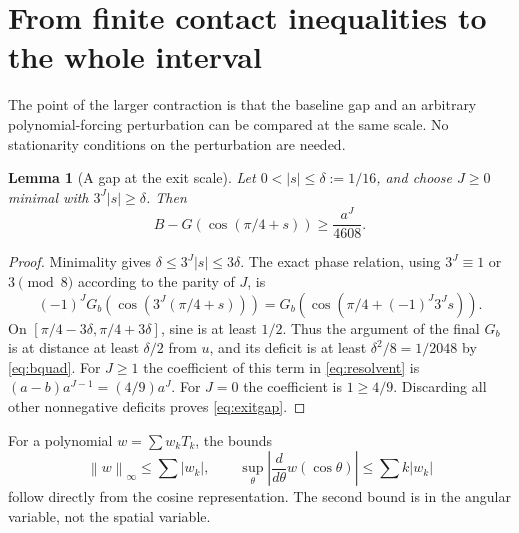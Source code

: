 \documentclass[11pt]{article}
\newtheorem{lemma}[theorem]{Lemma}
\theoremstyle{remark}\newtheorem{remark}[theorem]{Remark}
\newcommand{\norm}[1]{\left\|#1\right\|_\infty}
\begin{document}
\section{From finite contact inequalities to the whole interval}

The point of the larger contraction is that the baseline gap and an
arbitrary polynomial-forcing perturbation can be compared at the same
scale. No stationarity conditions on the perturbation are needed.

\begin{lemma}[A gap at the exit scale]\label{lem:exit}
Let $0<|s|\le\delta:=1/16$, and choose $J\ge0$ minimal with
$3^J|s|\ge\delta$. Then
\begin{equation}\label{eq:exitgap}
 B-G(\cos(\pi/4+s))\ge\frac{a^J}{4608}.
\end{equation}
\end{lemma}
\begin{proof}
Minimality gives $\delta\le3^J|s|\le3\delta$. The exact phase relation,
using $3^J\equiv1$ or $3\pmod8$ according to the parity of $J$, is
\[
 (-1)^JG_b(\cos(3^J(\pi/4+s)))
 =G_b(\cos(\pi/4+(-1)^J3^Js)).
\]
On $[\pi/4-3\delta,\pi/4+3\delta]$, sine is at least $1/2$.
Thus the argument of the final $G_b$ is at distance at least
$\delta/2$ from $u$, and its deficit is at least
$\delta^2/8=1/2048$ by \eqref{eq:bquad}.
For $J\ge1$ the coefficient of this term in \eqref{eq:resolvent} is
$(a-b)a^{J-1}=(4/9)a^J$. For $J=0$ the coefficient is $1\ge4/9$.
Discarding all other nonnegative deficits proves \eqref{eq:exitgap}.
\end{proof}

For a polynomial $w=\sum w_kT_k$, the bounds
\[
 \norm w\le\sum|w_k|,\qquad
 \sup_\theta\left|\frac{d}{d\theta}w(\cos\theta)\right|
 \le\sum k|w_k|
\]
follow directly from the cosine representation. The second bound is in
the angular variable, not the spatial variable.
\end{document}
